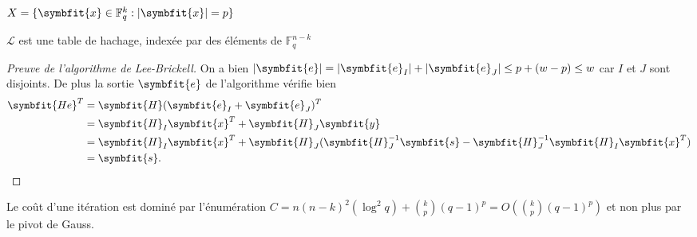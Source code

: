 \documentclass{scrartcl}[a4paper,9pt,headings=small,footinclude=false]
\theoremstyle{definition}
\theoremstyle{remark}
\begin{document}
\begin{algorithm}[H]
    \renewcommand{\algorithmcfname}{Algorithme}%
    \SetAlgoLined
    $X=\{ \symbfit{x}\in\mathbb{F}_q^{k} :|\symbfit{x}| = p \}$
    
    $\mathcal{L}$ est une table de hachage, indexée par des éléments de $\mathbb{F}_q^{n-k}$
    	
\caption{Algorithme de Lee-Brickell}
\end{algorithm}

\begin{proof}[Preuve de l'algorithme de Lee-Brickell]
On a bien $|\symbfit{e}|=|\symbfit{e}_I|+|\symbfit{e}_J|\leq p + (w - p)\leq w$ car $I$ et $J$ sont disjoints.
De plus la sortie $\symbfit{e}$ de l'algorithme vérifie bien
\begin{align*}
    \symbfit{He}^T &= \symbfit{H}(\symbfit{e}_I+\symbfit{e}_J)^T\\
    &= \symbfit{H}_I \symbfit{x}^T + \symbfit{H}_J \symbfit{y}\\
    &= \symbfit{H}_I \symbfit{x}^T + \symbfit{H}_J (\symbfit{H}_J^{-1}\symbfit{s} - \symbfit{H}_J^{-1}\symbfit{H}_I\symbfit{x}^T)\\
    &= \symbfit{s}.
\end{align*}
\end{proof}

Le coût d'une itération est dominé par l'énumération $C=n(n-k)^2(\log^2 q) + \binom{k}{p}(q-1)^p=O(\binom{k}{p}(q-1)^p)$ et non plus par le pivot de Gauss. 
\end{document}
